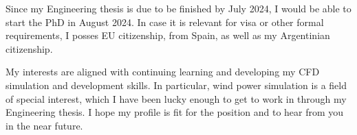 \documentclass{letter}
\newcommand{\thesisname}{Parametric analysis of actuator disks models to simulate wind farms}
\begin{document}
\begin{letter}{}
Since my Engineering thesis is due to be finished by July 2024, I would be able to start the PhD in August 2024.
In case it is relevant for visa or other formal requirements, I posses EU citizenship, from Spain, as well as my Argentinian citizenship.

  My interests are aligned with continuing learning and developing my CFD simulation and development skills. 
  In particular, wind power simulation is a field of special interest, which I have been lucky enough to get to work in through my Engineering thesis. 
  I hope my profile is fit for the position and to hear from you in the near future.




\end{letter}
\end{document}
